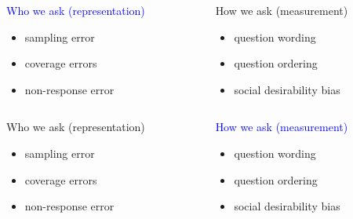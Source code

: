 \documentclass[aspectratio=169]{beamer}
\begin{document}
\begin{frame}
\begin{columns}[T]

\begin{column}{0.48\textwidth}
\textcolor{blue}{
{\Large Who we ask} (representation)}\\
\begin{itemize}
\item sampling error
\item coverage errors
\item non-response error
\end{itemize}
\end{column}


\begin{column}{0.48\textwidth}
{\Large How we ask} (measurement)\\
\begin{itemize}
\item question wording
\item question ordering
\item social desirability bias
\end{itemize}
\end{column}

\end{columns}

\end{frame}
\begin{frame}
\begin{columns}[T]

\begin{column}{0.48\textwidth}

{\Large Who we ask} (representation)\\
\begin{itemize}
\item sampling error
\item coverage errors
\item non-response error
\end{itemize}
\end{column}

\begin{column}{0.48\textwidth}
\textcolor{blue}{{\Large How we ask} (measurement)}\\
\begin{itemize}
\item question wording
\item question ordering
\item social desirability bias
\end{itemize}
\end{column}
\end{columns}

\end{frame}
\end{document}
